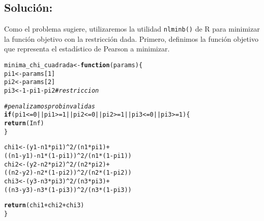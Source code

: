 \documentclass[paper=letter, fontsize=11pt, draft=false]{scrartcl}\usepackage[]{graphicx}\usepackage[]{xcolor}
\makeatletter
\newcommand{\hlnum}[1]{\textcolor[rgb]{0.686,0.059,0.569}{#1}}%
\newcommand{\hlcom}[1]{\textcolor[rgb]{0.678,0.584,0.686}{\textit{#1}}}%
\newcommand{\hlopt}[1]{\textcolor[rgb]{0,0,0}{#1}}%
\newcommand{\hldef}[1]{\textcolor[rgb]{0.345,0.345,0.345}{#1}}%
\newcommand{\hlkwa}[1]{\textcolor[rgb]{0.161,0.373,0.58}{\textbf{#1}}}%
\newcommand{\hlkwb}[1]{\textcolor[rgb]{0.69,0.353,0.396}{#1}}%
\newcommand{\hlkwc}[1]{\textcolor[rgb]{0.333,0.667,0.333}{#1}}%
\newcommand{\hlkwd}[1]{\textcolor[rgb]{0.737,0.353,0.396}{\textbf{#1}}}%
\newenvironment{kframe}{%
 \def\at@end@of@kframe{}%
 \ifinner\ifhmode%
  \def\at@end@of@kframe{\end{minipage}}%
  \begin{minipage}{\columnwidth}%
 \fi\fi%
 \def\FrameCommand##1{\hskip\@totalleftmargin \hskip-\fboxsep
 \colorbox{shadecolor}{##1}\hskip-\fboxsep
     \hskip-\linewidth \hskip-\@totalleftmargin \hskip\columnwidth}%
 \MakeFramed {\advance\hsize-\width
   \@totalleftmargin\z@ \linewidth\hsize
   \@setminipage}}%
 {\par\unskip\endMakeFramed%
 \at@end@of@kframe}
\newenvironment{knitrout}{}{} %
\numberwithin{equation}{problemcounter} %
\numberwithin{figure}{problemcounter} %
\numberwithin{table}{problemcounter} %
\numberwithin{subsection}{problemcounter}
\makeatother
\begin{document}
\subsection{\textbf{Solución:}}

Como el problema sugiere, utilizaremos la utilidad \texttt{nlminb()} de R para minimizar la función objetivo con la restricción dada. Primero, definimos la función objetivo que representa el estadístico de Pearson a minimizar.


\begin{knitrout}
\color{fgcolor}\begin{kframe}
\begin{alltt}
\hldef{minima_chi_cuadrada} \hlkwb{<-} \hlkwa{function}\hldef{(}\hlkwc{params}\hldef{) \{}
  \hldef{pi1} \hlkwb{<-} \hldef{params[}\hlnum{1}\hldef{]}
  \hldef{pi2} \hlkwb{<-} \hldef{params[}\hlnum{2}\hldef{]}
  \hldef{pi3} \hlkwb{<-} \hlnum{1} \hlopt{-} \hldef{pi1} \hlopt{-} \hldef{pi2} \hlcom{# restriccion}

  \hlcom{# penalizamos prob invalidas}
  \hlkwa{if} \hldef{(pi1} \hlopt{<=} \hlnum{0} \hlopt{||} \hldef{pi1} \hlopt{>=} \hlnum{1} \hlopt{||} \hldef{pi2} \hlopt{<=} \hlnum{0} \hlopt{||} \hldef{pi2} \hlopt{>=} \hlnum{1} \hlopt{||} \hldef{pi3} \hlopt{<=} \hlnum{0} \hlopt{||} \hldef{pi3} \hlopt{>=} \hlnum{1}\hldef{) \{}
    \hlkwd{return}\hldef{(}\hlnum{Inf}\hldef{)}
  \hldef{\}}

  \hldef{chi1} \hlkwb{<-} \hldef{(y1} \hlopt{-} \hldef{n1} \hlopt{*} \hldef{pi1)}\hlopt{^}\hlnum{2} \hlopt{/} \hldef{(n1} \hlopt{*} \hldef{pi1)} \hlopt{+}
          \hldef{((n1}\hlopt{-}\hldef{y1)} \hlopt{-} \hldef{n1}\hlopt{*}\hldef{(}\hlnum{1}\hlopt{-}\hldef{pi1))}\hlopt{^}\hlnum{2} \hlopt{/} \hldef{(n1} \hlopt{*} \hldef{(}\hlnum{1} \hlopt{-} \hldef{pi1))}
  \hldef{chi2} \hlkwb{<-} \hldef{(y2} \hlopt{-} \hldef{n2} \hlopt{*} \hldef{pi2)}\hlopt{^}\hlnum{2} \hlopt{/} \hldef{(n2} \hlopt{*} \hldef{pi2)} \hlopt{+}
          \hldef{((n2}\hlopt{-}\hldef{y2)} \hlopt{-} \hldef{n2}\hlopt{*}\hldef{(}\hlnum{1}\hlopt{-}\hldef{pi2))}\hlopt{^}\hlnum{2} \hlopt{/} \hldef{(n2} \hlopt{*} \hldef{(}\hlnum{1} \hlopt{-} \hldef{pi2))}
  \hldef{chi3} \hlkwb{<-} \hldef{(y3} \hlopt{-} \hldef{n3} \hlopt{*} \hldef{pi3)}\hlopt{^}\hlnum{2} \hlopt{/} \hldef{(n3} \hlopt{*} \hldef{pi3)} \hlopt{+}
          \hldef{((n3}\hlopt{-}\hldef{y3)} \hlopt{-} \hldef{n3}\hlopt{*}\hldef{(}\hlnum{1}\hlopt{-}\hldef{pi3))}\hlopt{^}\hlnum{2} \hlopt{/} \hldef{(n3} \hlopt{*} \hldef{(}\hlnum{1} \hlopt{-} \hldef{pi3))}

  \hlkwd{return}\hldef{(chi1} \hlopt{+} \hldef{chi2} \hlopt{+} \hldef{chi3)}
\hldef{\}}
\end{alltt}
\end{kframe}
\end{knitrout}
\end{document}
